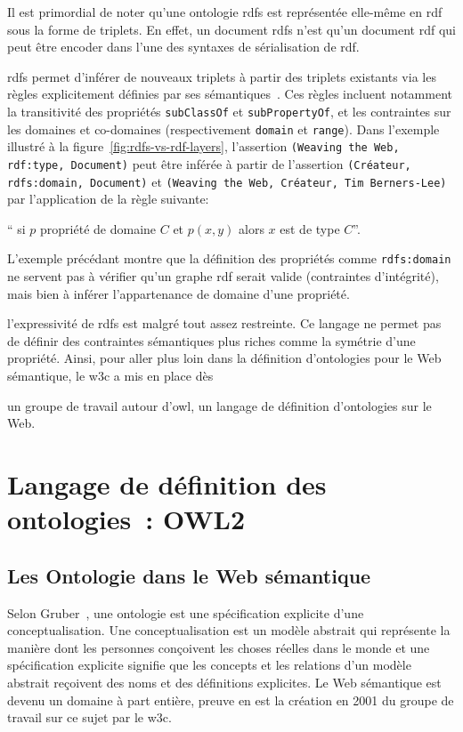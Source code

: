 Il est primordial de noter qu'une ontologie \acrshort{rdfs} est
représentée elle-même en \acrshort{rdf} sous la forme de triplets. En
effet, un document \acrshort{rdfs} n'est qu'un document \acrshort{rdf}
qui peut être encoder dans l'une des syntaxes de sérialisation de
\acrshort{rdf}.\medskip

\acrshort{rdfs} permet d'inférer de nouveaux triplets à partir des
triplets existants via les règles explicitement définies par ses
sémantiques~\cite{hayes2004rdf}. Ces règles incluent notamment la
transitivité des propriétés \texttt{subClassOf} et
\texttt{subPropertyOf}, et les contraintes sur les domaines et
co-domaines (respectivement \texttt{domain} et \texttt{range}). Dans
l'exemple illustré à la figure~\ref{fig:rdfs-vs-rdf-layers},
l'assertion \texttt{(Weaving the Web, rdf:type, Document)} peut être
inférée à partir de l'assertion \texttt{(Créateur, rdfs:domain,
  Document)} et \texttt{(Weaving the Web, Créateur, Tim Berners-Lee)}
par l'application de la règle suivante:\smallskip

`` si $p$ propriété de domaine $C$ et $p(x, y)$ alors $x$ est de type
$C$''.\medskip

L'exemple précédant montre que la définition des propriétés comme
\texttt{rdfs:domain} ne servent pas à vérifier qu'un graphe
\acrshort{rdf} serait valide (contraintes d'intégrité), mais bien à
inférer l'appartenance de domaine d'une propriété.\medskip

l'expressivité de \acrshort{rdfs} est malgré tout assez restreinte. Ce
langage ne permet pas de définir des contraintes sémantiques plus
riches comme la symétrie d'une propriété. Ainsi, pour aller plus loin
dans la définition d'ontologies pour le Web sémantique, le
\acrshort{w3c} a mis en place dès \date{2001} un groupe de travail
autour d'\acrshort{owl}, un langage de définition d'ontologies sur le
Web.\medskip

\section{Langage de définition des ontologies~: OWL2}
\label{sec:semantic-web-owl2}

\subsection{Les Ontologie dans le Web sémantique}
\label{sec:semantic-web-owl2-ontolgies}

Selon Gruber~\cite{gruber1993translation}, une ontologie est une
spécification explicite d'une conceptualisation. Une conceptualisation
est un modèle abstrait qui représente la manière dont les personnes
conçoivent les choses réelles dans le monde et une spécification
explicite signifie que les concepts et les relations d'un modèle
abstrait reçoivent des noms et des définitions explicites. Le Web
sémantique est devenu un domaine à part entière, preuve en est la
création en 2001 du groupe de travail sur ce sujet par le
\acrshort{w3c}.

